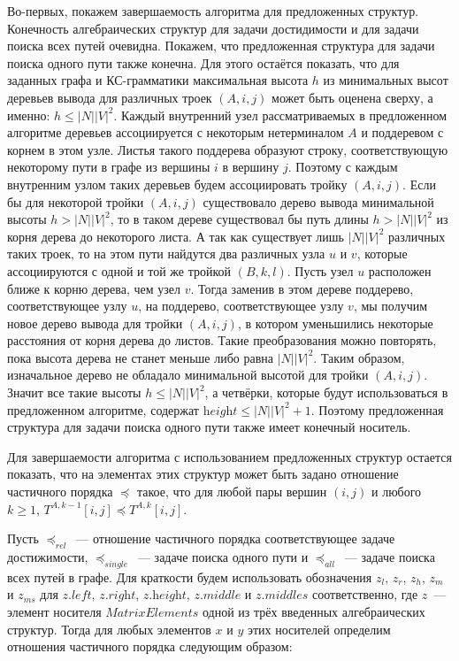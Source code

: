 Во-первых, покажем завершаемость алгоритма для предложенных структур. Конечность алгебраических структур для задачи достидимости и для задачи поиска всех путей очевидна. Покажем, что предложенная структура для задачи поиска одного пути также конечна. Для этого остаётся показать, что для заданных графа и КС-грамматики максимальная высота $h$ из минимальных высот деревьев вывода для различных троек $(A, i, j)$ может быть оценена сверху, а именно: $h \leq |N||V|^2$. Каждый внутренний узел рассматриваемых в предложенном алгоритме деревьев ассоциируется с некоторым нетерминалом $A$ и поддеревом с корнем в этом узле. Листья такого поддерева образуют строку, соответствующую некоторому пути в графе из вершины $i$ в вершину $j$. Поэтому с каждым внутренним узлом таких деревьев будем ассоциировать тройку $(A, i, j)$. Если бы для некоторой тройки $(A, i, j)$ существовало дерево вывода минимальной высоты $h > |N||V|^2$, то в таком дереве существовал бы путь длины $h > |N||V|^2$ из корня дерева до некоторого листа. А так как существует лишь $|N||V|^2$ различных таких троек, то на этом пути найдутся два различных узла $u$ и $v$, которые ассоциируются с одной и той же тройкой $(B, k, l)$. Пусть узел $u$ расположен ближе к корню дерева, чем узел $v$. Тогда заменив в этом дереве поддерево, соответствующее узлу $u$, на поддерево, соответствующее узлу $v$, мы получим новое дерево вывода для тройки $(A, i, j)$, в котором уменьшились некоторые расстояния от корня дерева до листов. Такие преобразования можно повторять, пока высота дерева не станет меньше либо равна $|N||V|^2$. Таким образом, изначальное дерево не обладало минимальной высотой для тройки $(A, i, j)$. Значит все такие высоты $h \leq |N||V|^2$, а четвёрки, которые будут использоваться в предложенном алгоритме, содержат $\textit{height} \leq |N||V|^2 + 1$. Поэтому предложенная структура для задачи поиска одного пути также имеет конечный носитель.

Для завершаемости алгоритма с использованием предложенных структур остается показать, что на элементах этих структур может быть задано отношение частичного порядка $\preceq$ такое, что для любой пары вершин $(i, j)$ и любого $k \geq 1$, $T^{A, k - 1}[i, j] \preceq T^{A, k}[i, j]$.

Пусть $\preceq_{\textit{rel}}$~--- отношение частичного порядка соответствующее задаче достижимости, $\preceq_{\textit{single}}$~--- задаче поиска одного пути и $\preceq_{\textit{all}}$~--- задаче поиска всех путей в графе. Для краткости будем использовать обозначения $z_l$, $z_r$, $z_h$, $z_m$ и $z_{ms}$ для $\textit{z.left}$, $\textit{z.right}$, $\textit{z.height}$, $\textit{z.middle}$ и $\textit{z.middles}$ соответственно, где $z$~--- элемент носителя $\textit{MatrixElements}$ одной из трёх введенных алгебраических структур. Тогда для любых элементов $x$ и $y$ этих носителей определим отношения частичного порядка следующим образом:

